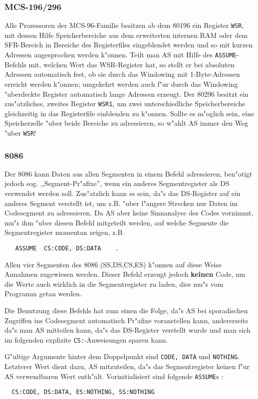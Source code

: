 \documentclass[12pt,a4paper,twoside]{report}
\newcommand{\bb}[1]{{\bf #1}}
\newcommand{\tty}[1]{{\tt #1}}
\begin{document}
{%

\subsubsection{MCS-196/296}

Alle Prozessoren der MCS-96-Familie besitzen ab dem 80196 ein Register \tty{WSR},
mit dessen Hilfe Speicherbereiche aus dem erweiterten internen RAM
oder dem SFR-Bereich in Bereiche des Registerfiles eingeblendet werden
und so mit kurzen Adressen angesprochen werden k"onnen.  Teilt man AS
mit Hilfe des \tty{ASSUME}-Befehls mit, welchen Wert das WSR-Register
hat, so stellt er bei absoluten Adressen automatisch fest, ob  sie
durch das Windowing mit 1-Byte-Adressen erreicht werden k"onnen;
umgekehrt werden auch f"ur durch das Windowing "uberdeckte Register
automatisch lange Adressen erzeugt.  Der 80296 besitzt ein zus"atzliches,
zweites Register \tty{WSR1}, um zwei unterschiedliche Speicherbereiche
gleichzeitig in das Registerfile einblenden zu k"onnen.  Sollte
es m"oglich sein, eine Speicherzelle "uber beide Bereiche zu adressieren,
so w"ahlt AS immer den Weg "uber \tty{WSR}!


\subsubsection{8086}

Der 8086 kann Daten aus allen Segmenten in einem Befehl adressieren,
ben"otigt jedoch sog. ,,Segment-Pr"afixe'', wenn ein anderes Segmentregister
als DS verwendet werden soll.  Zus"atzlich kann es sein, da"s das
DS-Register auf ein anderes Segment verstellt ist, um z.B. "uber l"angere
Strecken nur Daten im Codesegment zu adressieren.  Da AS aber keine
Sinnanalyse des Codes vornimmt, mu"s ihm "uber diesen Befehl mitgeteilt
werden, auf welche Segmente die Segmentregister momentan zeigen, z.B.
\begin{verbatim}
   ASSUME  CS:CODE, DS:DATA    .
\end{verbatim}
Allen vier Segmenten des 8086 (SS,DS,CS,ES) k"onnen auf diese Weise Annahmen
zugewiesen werden.  Dieser Befehl erzeugt jedoch \bb{keinen} Code, um
die Werte auch wirklich in die Segmentregister zu laden, dies mu"s vom
Programm getan werden.
\par
Die Benutzung diese Befehls hat zum einen die Folge, da"s AS bei
sporadischen Zugriffen ins Codesegment automatisch Pr"afixe voranstellen
kann, andererseits da"s man AS mitteilen kann, da"s das DS-Register verstellt
wurde und man sich im folgenden explizite \tty{CS:}-Anweisungen sparen
kann.
\par
G"ultige Argumente hinter dem Doppelpunkt sind \tty{CODE, DATA} und
\tty{NOTHING}.  Letzterer Wert dient dazu, AS mitzuteilen, da"s das
Segmentregister keinen f"ur AS verwendbaren Wert enth"alt.
Vorinitialisiert sind folgende \tty{ASSUME}s :
\begin{verbatim}
  CS:CODE, DS:DATA, ES:NOTHING, SS:NOTHING
\end{verbatim}

}
\end{document}
